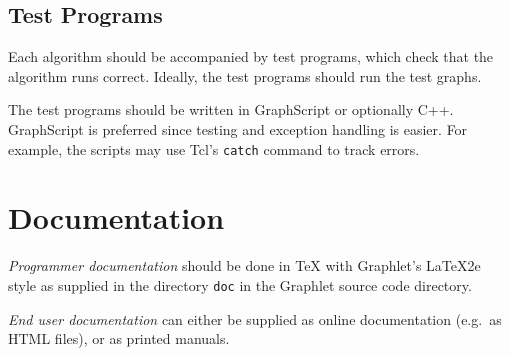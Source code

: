 \documentclass[notitlepage,twoside,fleqn]{article}
\begin{document}
\subsection{Test Programs}

Each algorithm should be accompanied by test programs, which
check that the algorithm runs correct. Ideally, the test programs
should run the test graphs.
  
The test programs should be written in GraphScript or optionally
C++.  GraphScript is preferred since testing and exception
handling is easier. For example, the scripts may use Tcl's
\texttt{catch} command to track errors.


\section{Documentation}

\emph{Programmer documentation} should be done in TeX with Graphlet's
LaTeX2e style as supplied in the directory \texttt{doc} in
the Graphlet source code directory.

\emph{End user documentation} can either be supplied as online
documentation (e.g.\ as HTML files), or as printed manuals.
\end{document}

